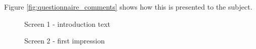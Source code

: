 Figure \ref{fig:questionnaire_comments} shows how this is presented to the subject.

\begin{figure}[h]
    \centering
    \caption{Screen 1 - introduction text}
    \label{fig:questionnaire_intro}
\end{figure}
 
\begin{figure}[h]
    \centering
    \caption{Screen 2 - first impression}
    \label{fig:questionnaire_firstImpression}
\end{figure}
 
